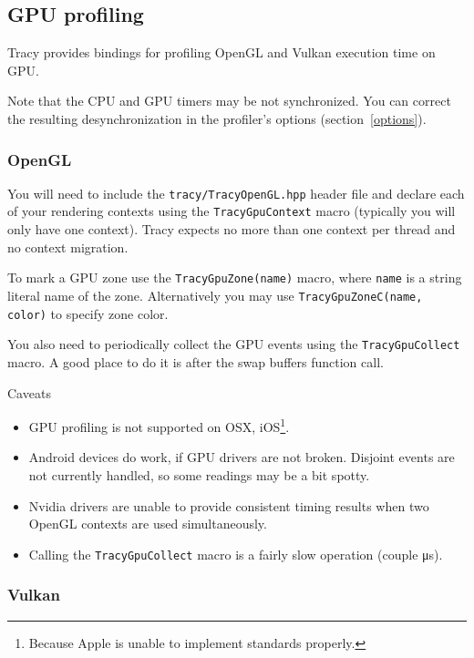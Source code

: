 \documentclass[hidelinks,titlepage,a4paper]{article}
\begin{document}
\subsection{GPU profiling}
\label{gpuprofiling}

Tracy provides bindings for profiling OpenGL and Vulkan execution time on GPU.

Note that the CPU and GPU timers may be not synchronized. You can correct the resulting desynchronization in the profiler's options (section~\ref{options}).

\subsubsection{OpenGL}

You will need to include the \texttt{tracy/TracyOpenGL.hpp} header file and declare each of your rendering contexts using the \texttt{TracyGpuContext} macro (typically you will only have one context). Tracy expects no more than one context per thread and no context migration.

To mark a GPU zone use the \texttt{TracyGpuZone(name)} macro, where \texttt{name} is a string literal name of the zone. Alternatively you may use \texttt{TracyGpuZoneC(name, color)} to specify zone color.

You also need to periodically collect the GPU events using the \texttt{TracyGpuCollect} macro. A good place to do it is after the swap buffers function call.

\begin{bclogo}[
noborder=true,
couleur=black!5,
logo=\bcattention
]{Caveats}
\begin{itemize}
\item GPU profiling is not supported on OSX, iOS\footnote{Because Apple is unable to implement standards properly.}.
\item Android devices do work, if GPU drivers are not broken. Disjoint events are not currently handled, so some readings may be a bit spotty.
\item Nvidia drivers are unable to provide consistent timing results when two OpenGL contexts are used simultaneously.
\item Calling the \texttt{TracyGpuCollect} macro is a fairly slow operation (couple \si{\micro\second}).
\end{itemize}
\end{bclogo}

\subsubsection{Vulkan}
\end{document}
